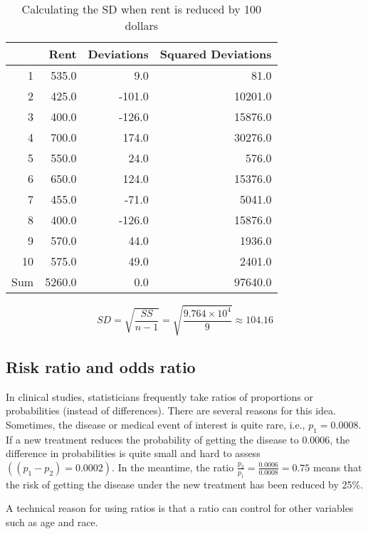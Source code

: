 \documentclass[11pt]{book}\usepackage[]{graphicx}\usepackage[]{color}
\begin{document}
\begin{table}[ht]
\centering
\begin{tabular}{rrrr}
  \hline
 & Rent & Deviations & Squared Deviations \\ 
  \hline
1 & 535.0 & 9.0 & 81.0 \\ 
  2 & 425.0 & -101.0 & 10201.0 \\ 
  3 & 400.0 & -126.0 & 15876.0 \\ 
  4 & 700.0 & 174.0 & 30276.0 \\ 
  5 & 550.0 & 24.0 & 576.0 \\ 
  6 & 650.0 & 124.0 & 15376.0 \\ 
  7 & 455.0 & -71.0 & 5041.0 \\ 
  8 & 400.0 & -126.0 & 15876.0 \\ 
  9 & 570.0 & 44.0 & 1936.0 \\ 
  10 & 575.0 & 49.0 & 2401.0 \\ 
  Sum & 5260.0 & 0.0 & 97640.0 \\ 
   \hline
\end{tabular}
\caption{Calculating the SD when rent is reduced by 100 dollars} 
\end{table}



$$ SD = \sqrt{ \frac{ SS}{n - 1}} = \sqrt{ \frac{ \ensuremath{9.764\times 10^{4}}}{9}} \approx 104.16 $$



\subsection{Risk ratio and odds ratio}   %

 In clinical studies, statisticians frequently take ratios of proportions or probabilities (instead of differences).  There are several reasons for this idea.  Sometimes, the disease or medical event of interest is quite rare, i.e., $p_1 = 0.0008$.  If a new treatment reduces the probability of getting the disease to 0.0006, the difference in probabilities is quite small and hard to assess $((p_1 - p_2) = 0.0002)$.  In the meantime, the ratio $ \frac{p_2}{p_1} = \frac{0.0006}{0.0008} = 0.75 $ means that the risk of getting the disease under the new treatment has been reduced by 25\%.

A technical reason for using ratios is that a ratio can control for other variables such as age and race.
\end{document}
